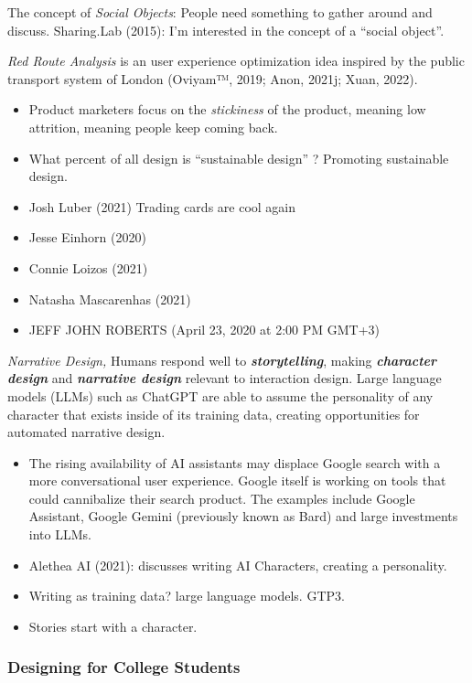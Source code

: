 \documentclass[
  letterpaper,
  DIV=11,
  numbers=noendperiod]{scrartcl}
\providecommand{\tightlist}{%
  \setlength{\itemsep}{0pt}\setlength{\parskip}{0pt}}\usepackage{longtable,booktabs,array}
\begin{document}
The concept of \emph{Social Objects}: People need something to gather
around and discuss. Sharing.Lab (2015): I'm interested in the concept of
a ``social object''.

\emph{Red Route Analysis} is an user experience optimization idea
inspired by the public transport system of London (Oviyam™, 2019; Anon,
2021j; Xuan, 2022).

\begin{itemize}
\tightlist
\item
  Product marketers focus on the \emph{stickiness} of the product,
  meaning low attrition, meaning people keep coming back.
\item
  What percent of all design is ``sustainable design'' ? Promoting
  sustainable design.
\item
  Josh Luber (2021) Trading cards are cool again
\item
  Jesse Einhorn (2020)
\item
  Connie Loizos (2021)
\item
  Natasha Mascarenhas (2021)
\item
  JEFF JOHN ROBERTS (April 23, 2020 at 2:00 PM GMT+3)
\end{itemize}

\emph{Narrative Design,} Humans respond well to
\textbf{\emph{storytelling}}, making \textbf{\emph{character design}}
and \textbf{\emph{narrative design}} relevant to interaction design.
Large language models (LLMs) such as ChatGPT are able to assume the
personality of any character that exists inside of its training data,
creating opportunities for automated narrative design.

\begin{itemize}
\item
  The rising availability of AI assistants may displace Google search
  with a more conversational user experience. Google itself is working
  on tools that could cannibalize their search product. The examples
  include Google Assistant, Google Gemini (previously known as Bard) and
  large investments into LLMs.
\item
  Alethea AI (2021): discusses writing AI Characters, creating a
  personality.
\item
  Writing as training data? large language models. GTP3.
\item
  Stories start with a character.
\end{itemize}

\subsubsection{Designing for College
Students}\label{designing-for-college-students}
\end{document}
